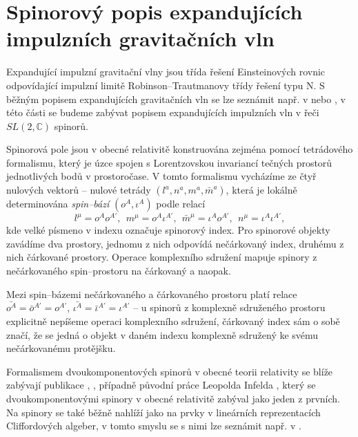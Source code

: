 \chapter{Spinorový popis expandujících impulzních gravitačních vln}

Expandující impulzní gravitační vlny jsou třída řešení Einsteinových rovnic odpovídající impulzní limitě
Robinson--Trautmanovy třídy řešení typu N. S běžným popisem expandujících gravitačních vln se lze seznámit např. v
\cite{Podolsky_1999} nebo \cite{Podolsky:2016mqg}, v této části se budeme zabývat
popisem expandujících impulzních vln v řeči $SL(2, \mathbb{C})$ spinorů.

Spinorová pole jsou v obecné relativitě konstruována zejména pomocí tetrádového formalismu,
který je úzce spojen s Lorentzovskou invariancí tečných prostorů jednotlivých bodů v prostoročase.
V tomto formalismu vycházíme ze čtyř nulových vektorů -- nulové tetrády $(l^a, n^a, m^a, \bar{m}^a)$,
která je lokálně determinována \emph{spin--bází} $(o^A, \iota^A)$ podle relací
\begin{equation}
    \label{eq:tetrad-spinor-basis-relation}
    l^\mu = o^A o^{A'}, ~~ m^\mu = o^A \iota^{A'}, ~~ \bar{m}^\mu = \iota^A o^{A'}, ~~ n^\mu = \iota^A \iota^{A'},
\end{equation}
kde velké písmeno v indexu označuje spinorový index. Pro spinorové objekty zavádíme dva prostory,
jednomu z nich odpovídá nečárkovaný index, druhému z nich čárkované prostory. Operace komplexního sdružení
mapuje spinory z nečárkovaného spin--prostoru na čárkovaný a naopak.

Mezi spin--bázemi nečárkovaného a čárkovaného prostoru platí relace $\bar{o^A} = \bar{o}^{A'} = o^{A'}$, $\bar{\iota^A} = \bar{\iota}^{A'} = \iota^{A'}$ --
u spinorů z komplexně sdruženého prostoru explicitně nepíšeme operaci komplexního sdružení, čárkovaný index sám o sobě značí,
že se jedná o objekt v daném indexu komplexně sdružený ke svému nečárkovanému protějšku.

Formalismem dvoukomponentových spinorů v obecné teorii relativity se blíže zabývají publikace
\cite{penrose_rindler_1984}, \cite{doi:10.1142/5222}, případně původní práce Leopolda Infelda \cite{zbMATH03005509},
který se dvoukomponentovými spinory v obecné relativitě zabýval jako jeden z prvních. Na spinory se také běžně
nahlíží jako na prvky v lineárních reprezentacích Cliffordových algeber, v tomto smyslu se s nimi lze seznámit např. v \cite{fecko_2006}.

